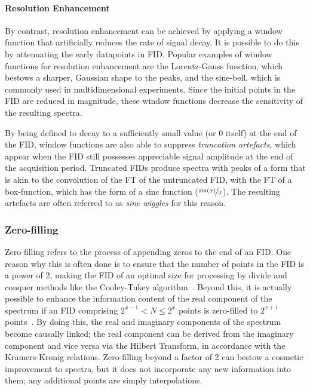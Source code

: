 \paragraph{Resolution Enhancement} By contrast, resolution enhancement can be
achieved by applying a window function that artificially reduces the rate of
signal decay. It is possible to do this by attenuating the early datapoints in
\ac{FID}. Popular examples of window functions for resolution enhancement are
the Lorentz-Gauss function, which bestows a sharper, Gaussian shape to the
peaks, and the sine-bell, which is commonly used in multidimensional
experiments.  Since the initial points in the \ac{FID} are reduced in
magnitude, these window functions decrease the sensitivity of the resulting
spectra.

By being defined to decay to a sufficiently small value (or $0$ itself) at the
end of
the \ac{FID}, window functions are also able to suppress \emph{truncation
artefacts}, which appear when the \ac{FID} still possesses appreciable signal
amplitude at the end of the acquisition period. Truncated \acp{FID} produce
spectra with peaks of a form that is akin to the convolution of the \ac{FT} of
the untruncated \ac{FID}, with the \ac{FT} of a box-function, which has the
form of a sinc function ($\nicefrac{\sin(x)}{x}$). The resulting artefacts
are often referred to as \emph{sinc wiggles} for this reason.

\subsubsection{Zero-filling}
Zero-filling refers to the process of appending zeros to the end of an
\ac{FID}. One reason why this is often done is to ensure that the number of
points in the \ac{FID} is a power of 2, making the \ac{FID} of an optimal size
for processing by divide and conquer methods like the Cooley-Tukey
algorithm~\cite{Cooley1965}. Beyond this, it is actually
possible to enhance the information content of the real component of the
spectrum if an \ac{FID} comprising $2^{x-1} < N \leq 2^x$ points is zero-filled
to $2^{x+1}$ points~\cite{Bartholdi1973}. By doing this, the real and imaginary
components of
the spectrum become causally linked; the real component can be derived from the
imaginary component and vice versa via the Hilbert Transform, in accordance
with the Kramers-Kronig relations.
Zero-filling beyond a factor of 2 can bestow a
cosmetic improvement to spectra, but it does not incorporate any new
information into them; any additional points are simply interpolations.

